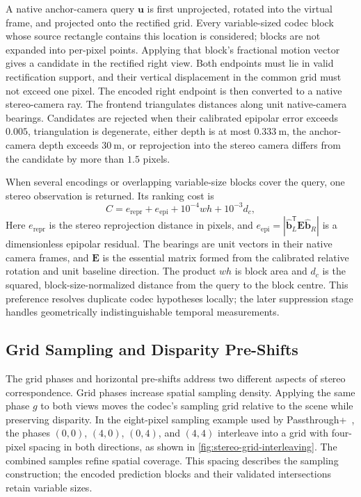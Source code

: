 A native anchor-camera query $\mathbf{u}$ is first unprojected, rotated into the virtual
frame, and projected onto the rectified grid. Every variable-sized codec block
whose source rectangle contains this location is considered; blocks are not
expanded into per-pixel points. Applying that block's fractional motion vector
gives a candidate in the rectified right view. Both endpoints must lie in valid
rectification support, and their vertical displacement in the common grid must
not exceed one pixel. The encoded right endpoint is then converted to a native
stereo-camera ray. The frontend triangulates distances along unit native-camera
bearings. Candidates are rejected when their calibrated epipolar error exceeds
$0.005$, triangulation is degenerate, either depth is at most
$\SI{0.333}{\metre}$, the anchor-camera depth exceeds $\SI{30}{\metre}$, or reprojection
into the stereo camera differs from the candidate by more than $1.5$ pixels.

When several encodings or overlapping variable-size blocks cover the query, one
stereo observation is returned. Its ranking cost is
\begin{equation}
  C = e_{\mathrm{repr}} + e_{\mathrm{epi}}
      + 10^{-4}wh + 10^{-3}d_c,
\end{equation}
Here $e_{\mathrm{repr}}$ is the stereo reprojection distance in pixels, and
$e_{\mathrm{epi}}=|\hat{\mathbf b}_L^{\mathsf T}\mathbf E\hat{\mathbf b}_R|$
is a dimensionless epipolar residual. The bearings are unit vectors in their
native camera frames, and $\mathbf E$ is the essential matrix formed from the
calibrated relative rotation and unit baseline direction.
The product $w h$ is block area and $d_c$ is the squared, block-size-normalized
distance from the query to the block centre. This preference resolves duplicate
codec hypotheses locally; the later suppression stage handles geometrically
indistinguishable temporal measurements.

\subsection{Grid Sampling and Disparity Pre-Shifts}

The grid phases and horizontal pre-shifts address two different aspects of
stereo correspondence. Grid phases increase spatial sampling density.
Applying the same phase $g$ to both views moves the codec's sampling grid
relative to the scene while preserving disparity. In the eight-pixel sampling
example used by Passthrough+~\cite{chaurasia2020passthrough}, the phases
$(0,0)$, $(4,0)$, $(0,4)$, and $(4,4)$ interleave into a grid with four-pixel
spacing in both directions, as shown in \autoref{fig:stereo-grid-interleaving}.
The combined samples refine spatial coverage. This spacing describes the
sampling construction; the encoded prediction blocks and their validated
intersections retain variable sizes.

